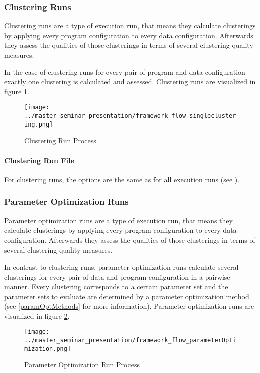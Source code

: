 		 \subsubsection{Clustering Runs}\label{clustering_runs}
		 Clustering runs are a type of execution run, that means they calculate clusterings by applying every program configuration to every data configuration. Afterwards they assess the qualities of those clusterings in terms of several clustering quality measures.
		 
		 In the case of clustering runs for every pair of program and data configuration exactly one clustering is calculated and assessed. Clustering runs are visualized in figure \ref{clustering_run_process}.
		 
		 \begin{figure}[hbtp]
		 \caption{Clustering Run Process}
		 \label{clustering_run_process}
		 \centering
		 \texttt{[image: ../master\_seminar\_presentation/framework\_flow\_singleclustering.png]}
		 \end{figure}
		 
		 \paragraph{Clustering Run File} For clustering runs, the options are the same as for all execution runs (see ).
		 
		  
		 \subsubsection{Parameter Optimization Runs}\label{paramOpt_runs}
		 Parameter optimization runs are a type of execution run, that means they calculate clusterings by applying every program configuration to every data configuration. Afterwards they assess the qualities of those clusterings in terms of several clustering quality measures.
		 
		In contrast to clustering runs, parameter optimization runs calculate several clusterings for every pair of data and program configuration in a pairwise manner. Every clustering corresponds to a certain parameter set and the parameter sets to evaluate are determined by a parameter optimization method (see \ref{paramOptMethods} for more information). Parameter optimization runs are visualized in figure \ref{paramOpt_run_process}.
		
		\begin{figure}[hbtp]
		\caption{Parameter Optimization Run Process}
		\label{paramOpt_run_process}
		\centering
		\texttt{[image: ../master\_seminar\_presentation/framework\_flow\_parameterOptimization.png]}
		\end{figure}
		
